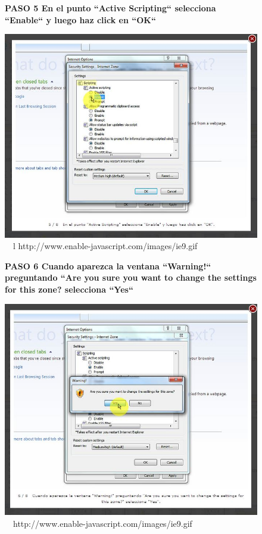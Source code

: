 \documentclass[11pt]{article} %
\begin{document}
\begin{figure}
\begin{center}

\begin{center}
\bf PASO 5
En el punto ``Active Scripting`` selecciona ``Enable`` y luego haz click en ``OK``
\end{center}
\includegraphics[height=8 cm, width=8 cm] {imagenes/explorer 05.JPG}
\newline
\newline
\ 
\ l {http://www.enable-javascript.com/images/ie9.gif }
\newline

\begin{center}
\bf PASO 6
Cuando aparezca la ventana ``Warning!``  preguntando  ``Are you sure you want to change the settings for this zone?  selecciona ``Yes``
\end{center}
\includegraphics[height=8 cm, width=8 cm] {imagenes/explorer 06.JPG}
\newline
\newline
\ 
\  {http://www.enable-javascript.com/images/ie9.gif }

\end{center}
\end{figure}
\end{document}
